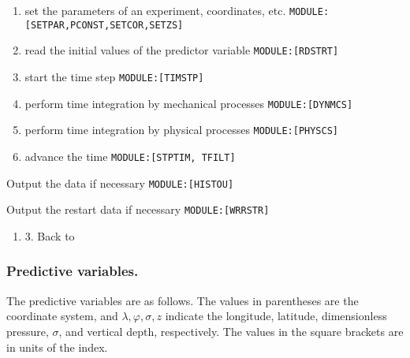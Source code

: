 \begin{enumerate}
\def\labelenumi{\arabic{enumi}.}
\item
  set the parameters of an experiment, coordinates, etc.
  \texttt{MODULE:{[}SETPAR,PCONST,SETCOR,SETZS{]}}
\item
  read the initial values of the predictor variable
  \texttt{MODULE:{[}RDSTRT{]}}
\item
  start the time step \texttt{MODULE:{[}TIMSTP{]}}
\item
  perform time integration by mechanical processes
  \texttt{MODULE:{[}DYNMCS{]}}
\item
  perform time integration by physical processes
  \texttt{MODULE:{[}PHYSCS{]}}
\item
  advance the time \texttt{MODULE:{[}STPTIM,\ TFILT{]}}
\end{enumerate}

Output the data if necessary \texttt{MODULE:{[}HISTOU{]}}

Output the restart data if necessary \texttt{MODULE:{[}WRRSTR{]}}

\begin{enumerate}
\def\labelenumi{\arabic{enumi}.}
\setcounter{enumi}{8}
\tightlist
\item
  3. Back to
\end{enumerate}

\hypertarget{predictive-variables.}{%
\subsubsection{Predictive variables.}\label{predictive-variables.}}

The predictive variables are as follows. The values in parentheses are
the coordinate system, and \(\lambda,\varphi,\sigma, z\) indicate the
longitude, latitude, dimensionless pressure, \(\sigma\), and vertical
depth, respectively. The values in the square brackets are in units of
the index.

